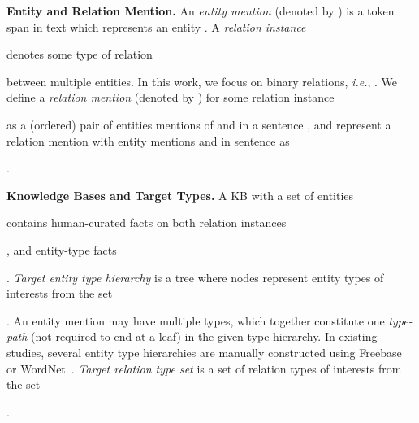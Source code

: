 \documentclass[letterpaper]{sig-alternate-2013}
\def\ie{{\sl i.e.}}
\begin{document}
\smallskip\noindent
\textbf{\small \textsf{Entity and Relation Mention.}}
An \textit{entity mention} (denoted by ) is a token span in text which represents an entity . A \textit{relation instance} \begin{small}\end{small} denotes some type of relation \begin{small}\end{small} between multiple entities. In this work, we focus on binary relations, \ie, .
We define a \textit{relation mention} (denoted by ) for some relation instance \begin{small}\end{small} as a (ordered) pair of entities mentions of  and  in a sentence , and represent a relation mention with entity mentions  and  in sentence  as \begin{small}\end{small}.

\smallskip\noindent
\textbf{\small \textsf{Knowledge Bases and Target Types.}}
A KB with a set of entities \begin{small}\end{small} contains human-curated facts on both relation instances \begin{small}\end{small}, and entity-type facts \begin{small}\end{small}. \textit{Target entity type hierarchy} is a tree where nodes represent entity types of interests from the set \begin{small}\end{small}. An entity mention may have multiple types, which together constitute one \textit{type-path} (not required to end at a leaf) in the given type hierarchy.
In existing studies, several entity type hierarchies are manually constructed using Freebase~\cite{lee2007fine,gillick2014context} or WordNet~\cite{yosef2012hyena}. \textit{Target relation type set} is a set of relation types of interests from the set \begin{small}\end{small}.
\end{document}
